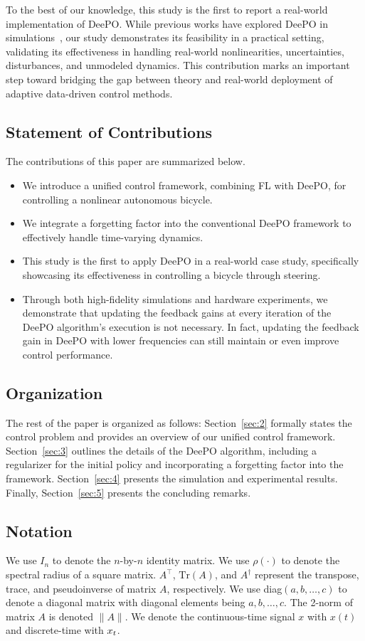 To the best of our knowledge, this study is the first to report a real-world implementation of DeePO. While previous works have explored DeePO in simulations~\cite{zhao2024data, zhao2024direct}, our study demonstrates its feasibility in a practical setting, validating its effectiveness in handling real-world nonlinearities, uncertainties, disturbances, and unmodeled dynamics. This contribution marks an important step toward bridging the gap between theory and real-world deployment of adaptive data-driven control methods.


\subsection{Statement of Contributions}
The contributions of this paper are summarized below.
\begin{itemize}  
    \item We introduce a unified control framework, combining FL with DeePO, for controlling a nonlinear autonomous bicycle.  
    \item We integrate a forgetting factor into the conventional DeePO framework to effectively handle time-varying dynamics.  
    \item This study is the first to apply DeePO in a real-world case study, specifically showcasing its effectiveness in controlling a bicycle through steering.
    \item Through both high-fidelity simulations and hardware experiments, we demonstrate that updating the feedback gains at every iteration of the DeePO algorithm's execution is not necessary. In fact, updating the feedback gain in DeePO with lower frequencies can still maintain or even improve control performance.
\end{itemize}  

\subsection{Organization}
The rest of the paper is organized as follows: Section~\ref{sec:2} formally states the control problem and provides an overview of our unified control framework. Section~\ref{sec:3} outlines the details of the DeePO algorithm, including a regularizer for the initial policy and incorporating a forgetting factor into the framework. Section~\ref{sec:4} presents the simulation and experimental results. Finally, Section~\ref{sec:5} presents the concluding remarks. 


\subsection{Notation}
We use $I_n$ to denote the $n$-by-$n$ identity matrix. We use $\rho(\cdot)$ to denote the spectral radius of a square matrix. 
$A^\top$, $\text{Tr}(A)$, and $A^\dagger$ represent the transpose, trace, and pseudoinverse of matrix $A$, respectively. We use diag$(a, b, \dots, c)$ to denote a diagonal matrix with diagonal elements being $a,b,\dots,c$. The 2-norm of matrix $A$ is denoted $\|A\|$. We denote the continuous-time signal $x$ with $x(t)$ and discrete-time with $x_{t}$. 